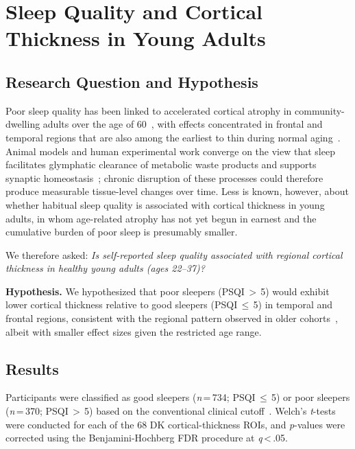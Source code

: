 
\section{Sleep Quality and Cortical Thickness in Young Adults}
\label{sec:rq1}

\subsection{Research Question and Hypothesis}

Poor sleep quality has been linked to accelerated cortical atrophy in community-dwelling adults over the age of 60~\cite{sexton2014poor, spira2016self}, with effects concentrated in frontal and temporal regions that are also among the earliest to thin during normal aging~\cite{fjell2010structural}.
Animal models and human experimental work converge on the view that sleep facilitates glymphatic clearance of metabolic waste products and supports synaptic homeostasis~\cite{krause2017sleep}; chronic disruption of these processes could therefore produce measurable tissue-level changes over time.
Less is known, however, about whether habitual sleep quality is associated with cortical thickness in young adults, in whom age-related atrophy has not yet begun in earnest and the cumulative burden of poor sleep is presumably smaller.

We therefore asked: \textit{Is self-reported sleep quality associated with regional cortical thickness in healthy young adults (ages 22--37)?}

\textbf{Hypothesis.}
We hypothesized that poor sleepers (PSQI\,$>$\,5) would exhibit lower cortical thickness relative to good sleepers (PSQI\,$\leq$\,5) in temporal and frontal regions, consistent with the regional pattern observed in older cohorts~\cite{sexton2014poor, branger2016relationships}, albeit with smaller effect sizes given the restricted age range.

\subsection{Results}

Participants were classified as good sleepers (\textit{n}\,=\,734; PSQI\,$\leq$\,5) or poor sleepers (\textit{n}\,=\,370; PSQI\,$>$\,5) based on the conventional clinical cutoff~\cite{buysse1989pittsburgh}.
Welch's \textit{t}-tests were conducted for each of the 68 DK cortical-thickness ROIs, and \textit{p}-values were corrected using the Benjamini-Hochberg FDR procedure at \textit{q}\,<\,.05.

